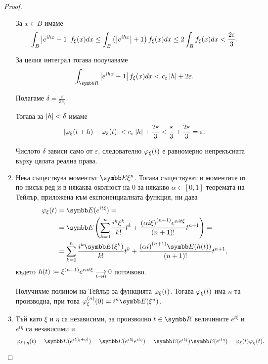 \documentclass[numbers=endperiod, bibliography=totocnumbered]{scrartcl}
\begin{document}
\begin{proof}
\begin{enumerate}
    За \( x \in B \) имаме
    \begin{equation*}
      \int_B \Abs{e^{ihx} - 1} f_\xi(x) dx
      \leq
      \int_B \left( \Abs{e^{ihx}} + 1 \right) f_\xi(x) dx
      \leq
      2 \int_B f_\xi(x) dx
      <
      \frac {2\varepsilon} 3.
    \end{equation*}

    За целия интеграл тогава получаваме
    \begin{equation*}
      \int_{\R} \Abs{e^{ihx} - 1} f_\xi(x) dx
      <
      c_\varepsilon \Abs{h} + 2 \varepsilon.
    \end{equation*}

    Полагаме \( \delta = \frac \varepsilon {3 c_\varepsilon} \).

    Тогава за \( \Abs h < \delta \) имаме
    \begin{equation*}
      \Abs{\Char_\xi(t + h) - \Char_\xi(t)}
      <
      c_\varepsilon \Abs{h} + \frac {2\varepsilon} 3
      <
      \frac {\varepsilon} 3 + \frac {2\varepsilon} 3
      =
      \varepsilon.
    \end{equation*}

    Числото \( \delta \) зависи само от \( \varepsilon \), следователно \( \Char_\xi(t) \) е равномерно непрекъсната върху цялата реална права.

    \item Нека съществува моментът \( \Expect \xi^n \). Тогава съществуват и моментите от по-нисък ред и в някаква околност на \( 0 \) за някакво \( \alpha \in [0, 1] \) теоремата на Тейлър, приложена към експоненциалната функция, ни дава
    \begin{align*}
      \Char_\xi(t)
      &=
      \Expect(e^{it\xi})
      = \\ &=
      \Expect\left(\sum_{k=0}^n \frac {i^k \xi^k} {k!} t^k + \frac {{(\alpha i \xi)}^{(n+1)} e^{\alpha it \xi}} {(n+1)!} t^{n+1} \right)
      = \\ &=
      \sum_{k=0}^n \frac {i^k \Expect(\xi^k)} {k!} t^k + \frac {{(\alpha i)}^{(n+1)} \Expect(h(t))} {(n+1)!} t^{n+1},
    \end{align*}
    където \( h(t) \coloneqq \xi^{(n+1)} e^{\alpha it \xi} \Conv[t \to 0]{} 0 \) поточково.

    Получихме полином на Тейлър за функцията \( \Char_\xi(t) \). Тогава \( \Char_\xi(t) \) има \( n \)-та производна, при това \( \Char^{(n)}_\xi(0) = i^n \Expect(\xi^n) \).

    \item Тъй като \( \xi \) и \( \eta \) са независими, за произволно \( t \in \R \) величините \( e^{t\xi} \) и \( e^{t\eta} \) са независими и
    \begin{equation*}
      \Char_{\xi + \eta}(t)
      =
      \Expect(e^{it(\xi + \eta)})
      =
      \Expect(e^{it\xi} e^{it\eta})
      =
      \Expect(e^{it\xi}) \Expect(e^{it\eta})
      =
      \Char_\xi(t) \Char_\eta(t).
    \end{equation*}


\end{enumerate}
\end{proof}
\end{document}
